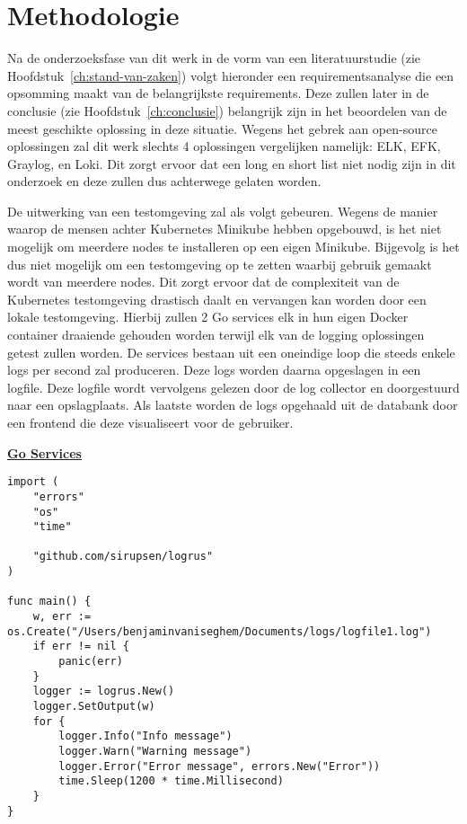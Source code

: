 
\chapter{Methodologie}
\label{ch:methodologie}


Na de onderzoeksfase van dit werk in de vorm van een literatuurstudie (zie Hoofdstuk~\ref{ch:stand-van-zaken}) volgt hieronder een requirementsanalyse die een opsomming maakt van de belangrijkste requirements. Deze zullen later in de conclusie (zie Hoofdstuk~\ref{ch:conclusie}) belangrijk zijn in het beoordelen van de meest geschikte oplossing in deze situatie. Wegens het gebrek aan open-source oplossingen zal dit werk slechts 4 oplossingen vergelijken namelijk: ELK, EFK, Graylog, en Loki. Dit zorgt ervoor dat een long en short list niet nodig zijn in dit onderzoek en deze zullen dus achterwege gelaten worden. 

De uitwerking van een testomgeving zal als volgt gebeuren. Wegens de manier waarop de mensen achter Kubernetes Minikube hebben opgebouwd, is het niet mogelijk om meerdere nodes te installeren op een eigen Minikube. Bijgevolg is het dus niet mogelijk om een testomgeving op te zetten waarbij gebruik gemaakt wordt van meerdere nodes. Dit zorgt ervoor dat de complexiteit van de Kubernetes testomgeving drastisch daalt en vervangen kan worden door een lokale testomgeving. Hierbij zullen 2 Go services elk in hun eigen Docker container draaiende gehouden worden terwijl elk van de logging oplossingen getest zullen worden. De services bestaan uit een oneindige loop die steeds enkele logs per second zal produceren. Deze logs worden daarna opgeslagen in een logfile. Deze logfile wordt vervolgens gelezen door de log collector en doorgestuurd naar een opslagplaats. Als laatste worden de logs opgehaald uit de databank door een frontend die deze visualiseert voor de gebruiker.

\textbf{\underline{Go Services}}\\
\begin{lstlisting}[caption=Log generator main function]
import (
    "errors"
    "os"
    "time"
    
    "github.com/sirupsen/logrus"
)

func main() {
    w, err := os.Create("/Users/benjaminvaniseghem/Documents/logs/logfile1.log")
    if err != nil {
        panic(err)
    }
    logger := logrus.New()
    logger.SetOutput(w)
    for {
        logger.Info("Info message")
        logger.Warn("Warning message")
        logger.Error("Error message", errors.New("Error"))
        time.Sleep(1200 * time.Millisecond)
    }
}
\end{lstlisting}

